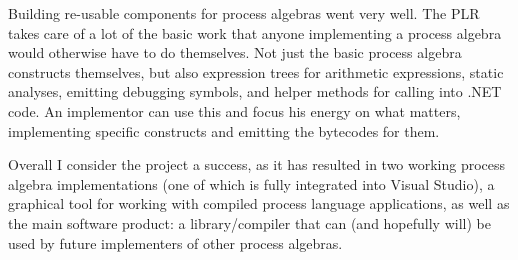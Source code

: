 	Building re-usable components for process algebras went very well. The PLR 
	takes care of a lot of the basic work that anyone implementing a process 
	algebra would otherwise have to do themselves. Not just the basic process 
	algebra constructs themselves, but also expression trees for arithmetic 
	expressions, static analyses, emitting debugging symbols, and helper methods 
	for calling into .NET code. An implementor can use this and focus his energy 
	on what matters, implementing specific constructs and emitting the bytecodes 
	for them.
	
	Overall I consider the project a success, as it has resulted in two working 
	process algebra implementations (one of which is fully integrated into 
	Visual Studio), a graphical tool for working with compiled process language 
	applications, as well as the main software product: a library/compiler that 
	can (and hopefully will) be used by future implementers of other process 
	algebras.